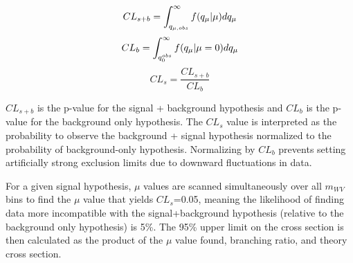  \begin{equation}
 CL_{s+b}=\int_{q_{\mu, obs}}^{\infty}f(q_{\mu}|\mu)dq_{\mu}\\
 \end{equation}
  \begin{equation}
CL_{b}=\int_{q_{0}^{obs}}^{\infty}f(q_{\mu}|\mu=0)dq_{\mu}\\
 \end{equation}
  \begin{equation}
CL_{s}=\frac{CL_{s+b}}{CL_{b}}
 \end{equation}

$CL_{s+b}$ is the p-value for the signal + background hypothesis and $CL_{b}$ is the p-value for the background only hypothesis. The $CL_{s}$ value is interpreted as the probability to observe the background + signal hypothesis normalized to the probability of background-only hypothesis. Normalizing by $CL_{b}$ prevents setting artificially strong exclusion limits due to downward fluctuations in data. 

For a given signal hypothesis, $\mu$ values are scanned simultaneously over all $m_{WV}$ bins to find the $\mu$ value that yields $CL_{s}$=0.05, meaning the likelihood of finding data more incompatible with the signal+background hypothesis (relative to the background only hypothesis) is 5\%. The 95\% upper limit on the cross section is then calculated as the product of the $\mu$ value found, branching ratio, and theory cross section.







